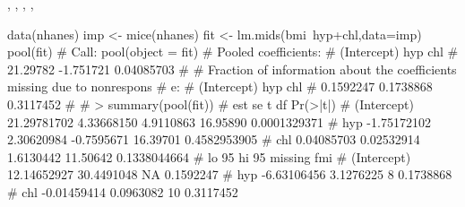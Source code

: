 \begin{SeeAlso}\relax
{}, , ,
, 
\end{SeeAlso}
\begin{Examples}
\begin{ExampleCode}
data(nhanes)
imp <- mice(nhanes)
fit <- lm.mids(bmi~hyp+chl,data=imp)
pool(fit)
#  Call: pool(object = fit)
#  Pooled coefficients:
#   (Intercept)       hyp        chl 
#      21.29782 -1.751721 0.04085703
#
#  Fraction of information about the coefficients missing due to nonrespons
#  e: 
#   (Intercept)       hyp       chl 
#     0.1592247 0.1738868 0.3117452
#
#  > summary(pool(fit))
#           est         se          t       df     Pr(>|t|) 
#  (Intercept)  21.29781702 4.33668150  4.9110863 16.95890 0.0001329371
#      hyp  -1.75172102 2.30620984 -0.7595671 16.39701 0.4582953905
#      chl   0.04085703 0.02532914  1.6130442 11.50642 0.1338044664
#             lo 95      hi 95 missing       fmi 
#  (Intercept)  12.14652927 30.4491048      NA 0.1592247
#      hyp  -6.63106456  3.1276225       8 0.1738868
#    chl  -0.01459414  0.0963082      10 0.3117452 
\end{ExampleCode}
\end{Examples}

